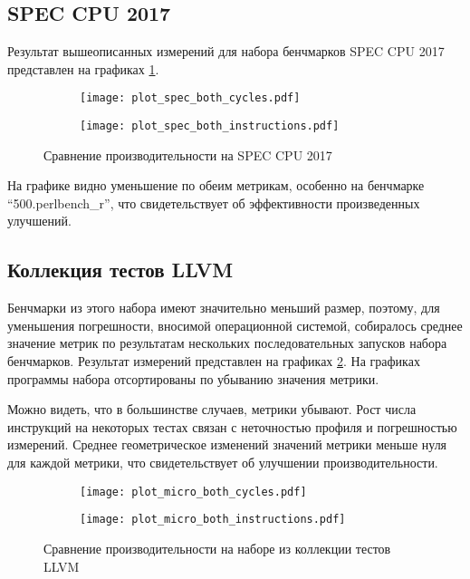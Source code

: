 \subsection{SPEC CPU\textsuperscript{\tiny\textregistered} 2017}

Результат вышеописанных измерений для набора бенчмарков SPEC CPU\textsuperscript{\tiny\textregistered} 2017 представлен на графиках \ref{fig:plot_spec_both}.

\begin{figure}
    \centering
    \begin{subfigure}{0.4\textwidth}
        \centering
        \texttt{[image: plot\_spec\_both\_cycles.pdf]}
    \end{subfigure}
    \begin{subfigure}{0.4\textwidth}
        \centering
        \texttt{[image: plot\_spec\_both\_instructions.pdf]}
    \end{subfigure}
    \caption{Сравнение производительности на SPEC CPU\textsuperscript{\tiny\textregistered} 2017}
    \label{fig:plot_spec_both}
\end{figure}

На графике видно уменьшение по обеим метрикам, особенно на бенчмарке \enquote{500.perlbench\_r}, что свидетельствует об эффективности произведенных улучшений.

\subsection{Коллекция тестов LLVM}

Бенчмарки из этого набора имеют значительно меньший размер, поэтому, для уменьшения погрешности, вносимой операционной системой, собиралось среднее значение метрик по результатам нескольких последовательных запусков набора бенчмарков.
Результат измерений представлен на графиках \ref{fig:plot_micro_both}.
На графиках программы набора отсортированы по убыванию значения метрики.

Можно видеть, что в большинстве случаев, метрики убывают.
Рост числа инструкций на некоторых тестах связан с неточностью профиля и погрешностью измерений.
Среднее геометрическое изменений значений метрики меньше нуля для каждой метрики, что свидетельствует об улучшении производительности.

\begin{figure}
    \centering
    \begin{subfigure}{0.4\textwidth}
        \centering
        \texttt{[image: plot\_micro\_both\_cycles.pdf]}
    \end{subfigure}
    \begin{subfigure}{0.4\textwidth}
        \centering
        \texttt{[image: plot\_micro\_both\_instructions.pdf]}
    \end{subfigure}
    \caption{Сравнение производительности на наборе из коллекции тестов LLVM}
    \label{fig:plot_micro_both}
\end{figure}

\newpage
